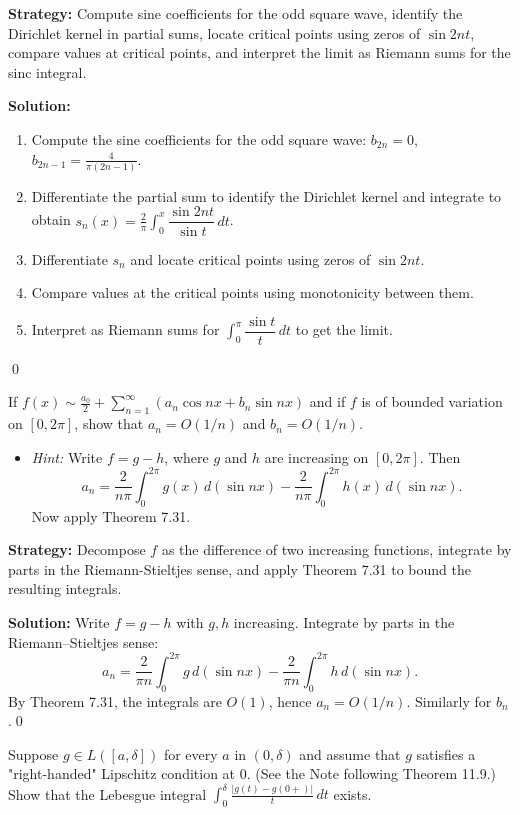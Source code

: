 \noindent\textbf{Strategy:} Compute sine coefficients for the odd square wave, identify the Dirichlet kernel in partial sums, locate critical points using zeros of $\sin 2nt$, compare values at critical points, and interpret the limit as Riemann sums for the sinc integral.

\bigskip\noindent\textbf{Solution:}
\begin{enumerate}[label=(\alph*)]
\item Compute the sine coefficients for the odd square wave: $b_{2n}=0$, $b_{2n-1}=\tfrac{4}{\pi(2n-1)}$.
\item Differentiate the partial sum to identify the Dirichlet kernel and integrate to obtain $s_n(x)=\tfrac{2}{\pi}\int_0^x \dfrac{\sin 2nt}{\sin t}\,dt$.
\item Differentiate $s_n$ and locate critical points using zeros of $\sin 2nt$.
\item Compare values at the critical points using monotonicity between them.
\item Interpret as Riemann sums for $\int_0^{\pi} \dfrac{\sin t}{t}\,dt$ to get the limit.
\end{enumerate}\qed


\begin{problembox}
If $f(x) \sim \frac{a_0}{2} + \sum_{n=1}^\infty (a_n \cos nx + b_n \sin nx)$ and if $f$ is of bounded variation on $[0, 2\pi]$, show that $a_n = O(1/n)$ and $b_n = O(1/n)$.
\begin{itemize}
\item \textit{Hint:} Write $f = g - h$, where $g$ and $h$ are increasing on $[0, 2\pi]$. Then
\[
a_n = \frac{2}{n\pi} \int_0^{2\pi} g(x) \, d(\sin nx) - \frac{2}{n\pi} \int_0^{2\pi} h(x) \, d(\sin nx).
\]
Now apply Theorem 7.31.
\end{itemize}
\end{problembox}

\noindent\textbf{Strategy:} Decompose $f$ as the difference of two increasing functions, integrate by parts in the Riemann-Stieltjes sense, and apply Theorem 7.31 to bound the resulting integrals.

\bigskip\noindent\textbf{Solution:}
Write $f=g-h$ with $g,h$ increasing. Integrate by parts in the Riemann–Stieltjes sense:
\[a_n=\frac{2}{\pi n}\int_0^{2\pi} g\,d(\sin nx)-\frac{2}{\pi n}\int_0^{2\pi} h\,d(\sin nx).\]
By Theorem 7.31, the integrals are $O(1)$, hence $a_n=O(1/n)$. Similarly for $b_n$.\qed


\begin{problembox}
Suppose $g \in L([a, \delta])$ for every $a$ in $(0, \delta)$ and assume that $g$ satisfies a "right-handed" Lipschitz condition at 0. (See the Note following Theorem 11.9.) Show that the Lebesgue integral $\int_0^\delta \frac{|g(t) - g(0+)|}{t} \, dt$ exists.
\end{problembox}

